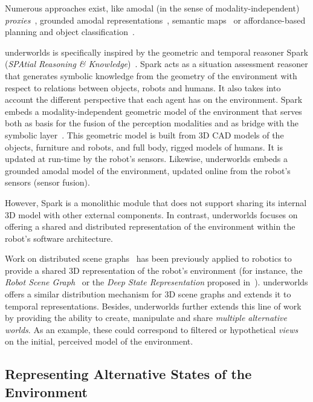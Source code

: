 \documentclass[conference]{IEEEtran}
\newcommand{\uwds}{{\sc underworlds}\xspace}
\begin{document}
Numerous approaches exist, like amodal (in the sense of modality-independent)
\emph{proxies}~\cite{Jacobsson2008}, grounded amodal
representations~\cite{Mavridis2006}, semantic
maps~\cite{Nuechter2008, Galindo2008,Blodow2011} or affordance-based planning
and object classification~\cite{Lorken2008, Varadarajan2011}.


\uwds is specifically inspired by the geometric and temporal reasoner
{\sc Spark} (\emph{SPAtial Reasoning \& Knowledge})~\cite{sisbot2011situation}.
{\sc Spark} acts as a situation assessment reasoner that generates symbolic
knowledge from the geometry of the environment with respect to relations between
objects, robots and humans. It also takes into account the different perspective
that each agent has on the environment. {\sc Spark} embeds a
modality-independent geometric model of the environment that serves both as
basis for the fusion of the perception modalities and as bridge with the
symbolic layer~\cite{lemaignan2016artificial}. This geometric model is built
from 3D CAD models of the objects, furniture and robots, and full body, rigged
models of humans.  It is updated at run-time by the robot's sensors.
Likewise, \uwds embeds a grounded amodal model of the environment, updated
online from the robot's sensors (sensor fusion).

However, {\sc Spark} is a monolithic module that does not support sharing its
internal 3D model with other external components. In contrast, \uwds focuses on
offering a shared and distributed representation of the environment within the
robot's software architecture.

Work on distributed scene graphs~\cite{naef2003blue} has been previously applied
to robotics to provide a shared 3D representation of the robot's environment
(for instance, the \emph{Robot Scene Graph}~\cite{blumenthal2013scene} or the
\emph{Deep State Representation} proposed in~\cite{bustos2016unified}).  \uwds
offers a similar distribution mechanism for 3D scene graphs and extends it to
temporal representations. Besides, \uwds further extends this line of work by
providing the ability to create, manipulate and share \emph{multiple alternative
worlds}. As an example, these could correspond to filtered or hypothetical \emph{views} on
the initial, perceived model of the environment.


\subsection{Representing Alternative States of the Environment}
\end{document}
